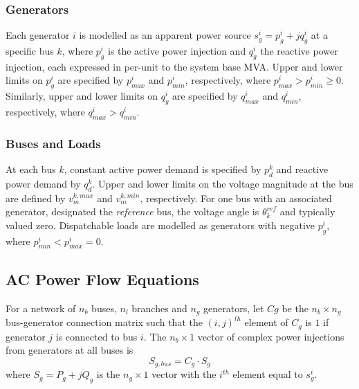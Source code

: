 \subsubsection{Generators}
\label{sec:generators}
Each generator $i$ is modelled as an apparent power source $s^i_g = p^i_g +
jq^i_g$ at a specific bus $k$, where $p^i_g$ is the active power injection and
$q^i_g$ the reactive power injection, each expressed in per-unit to the system
base MVA. Upper and lower limits on $p^i_g$ are specified by $p^i_{max}$ and
$p^i_{min}$, respectively, where $p^i_{max} > p^i_{min} \geq 0$.  Similarly,
upper and lower limits on $q^i_g$ are specified by $q_{max}^i$ and
$q_{min}^i$, respectively, where $q^i_{max} > q^i_{min}$.

\subsubsection{Buses and Loads}
At each bus $k$, constant active power demand is specified by
$p^k_d$ and reactive power demand by $q^k_d$.  Upper and lower
limits on the voltage magnitude at the bus are defined by $v_m^{k,max}$ and
$v_m^{k,min}$, respectively.  For one bus with an associated generator,
designated the \textit{reference} bus, the voltage angle is $\theta^{ref}_k$
and typically valued zero.
Dispatchable loads are modelled as generators with negative $p^i_g$, where
$p^i_{min} < p^i_{max} = 0$. %

\subsection{AC Power Flow Equations}
For a network of $n_b$ buses, $n_l$ branches and $n_g$ generators, let $Cg$ be
the $n_b \times n_g$ bus-generator connection matrix such that the $(i,j)^{th}$
element of $C_{g}$ is $1$ if generator $j$ is connected to bus $i$.  The
$n_b \times 1$ vector of complex power injections from generators at all buses
is
\begin{equation}
S_{g,bus} = C_g \cdot S_g
\end{equation}
where $S_g = P_g + jQ_g$ is the $n_g \times 1$ vector with the $i^{th}$ element
equal to $s^i_g$.

